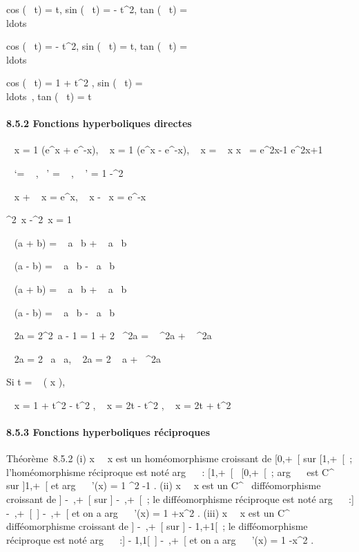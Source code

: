 cos (\arccos~ t) = t,
sin (\arccos~ t) =
 - t^2,
tan (\arccos~ t) =
\\ldots~

cos (\arcsin~ t) =
 - t^2,
sin (\arcsin~ t) = t,
tan (\arcsin~ t) =
\\ldots~

cos (\arctan~ t) = 1
\over {} + t^2 ,
sin (\arctan~ t) =
\\ldots~,
tan (\arctan~ t) = t

\paragraph{8.5.2 Fonctions hyperboliques directes}

\mathrmch~ x = 1
 (e^x + e^-x),
\mathrmsh~ x = 1
 (e^x - e^-x),
\mathrmth~ x =
\mathrmsh~ x
\over
\mathrmch x~ =
e^2x-1 \over e^2x+1

 \mathrmch~
`= \mathrmsh~ ,
\mathrmsh~'
= \mathrmch~ ,
\mathrmth~ ' = 1
-\mathrmth ^2~

 \mathrmch~ x
+ \mathrmsh~ x =
e^x, \mathrmch~ x
-\mathrmsh~ x =
e^-x

 \mathrmch ^2~x
-\mathrmsh ^2~x =
1

\mathrmch~ (a + b)
= \mathrmch~
a\mathrmch~ b
+ \mathrmsh~
a\mathrmsh~ b

\mathrmch~ (a - b)
= \mathrmch~
a\mathrmch~ b
-\mathrmsh~
a\mathrmsh~ b

\mathrmsh~ (a + b)
= \mathrmsh~
a\mathrmch~ b
+ \mathrmch~
a\mathrmsh~ b

\mathrmsh~ (a - b)
= \mathrmsh~
a\mathrmch~ b
-\mathrmch~
a\mathrmsh~ b

\mathrmch~ 2a =
2\mathrmch ^2~a -
1 = 1 + 2\mathrmsh~
^2a = \mathrmch~
^2a + \mathrmsh~
^2a

\mathrmsh~ 2a =
2\mathrmsh~
a\mathrmch~ a,
\mathrmth~ 2a =
2 \mathrmth~ a
+\mathrmth~
^2a

Si t = \mathrmth~ ( x
 ),

\mathrmch~ x = 1 +
t^2  - t^2 ,
\mathrmsh~ x = 2t
 - t^2 ,
\mathrmth~ x = 2t
 + t^2

\paragraph{8.5.3 Fonctions hyperboliques réciproques}

Théorème~8.5.2 (i)
x\mapsto~\mathrmch~
x est un homéomorphisme croissant de {[}0,+\infty~{[} sur {[}1,+\infty~{[}~;
l'homéomorphisme réciproque est noté arg~
\mathrmch~ : {[}1,+\infty~{[}\rightarrow~
{[}0,+\infty~{[}~; arg~
\mathrmch~ est
C^\infty~ sur {]}1,+\infty~{[} et arg~
\mathrmch~ '(x) = 1
\over \sqrtx^2  -1 . (ii)
x\mapsto~\mathrmsh~
x est un C^\infty~ difféomorphisme croissant de {]} -\infty~,+\infty~{[} sur
{]} -\infty~,+\infty~{[}~; le difféomorphisme réciproque est noté
arg~
\mathrmsh~ :{]} -\infty~,+\infty~{[}\rightarrow~{]}
-\infty~,+\infty~{[} et on a arg~
\mathrmsh~ '(x) = 1
\over {}+x^2 . (iii)
x\mapsto~\mathrmth~
x est un C^\infty~ difféomorphisme croissant de {]} -\infty~,+\infty~{[} sur
{]} - 1,+1{[}~; le difféomorphisme réciproque est noté
arg~
\mathrmth~ :{]} - 1,1{[}\rightarrow~{]}
-\infty~,+\infty~{[} et on a arg~
\mathrmth~ '(x) = 1
-x^2 .

